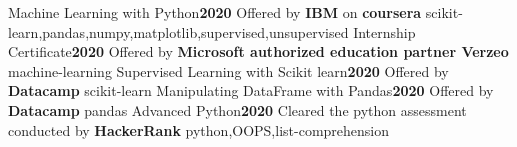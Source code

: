 \begin{projects}
\project
{Machine Learning with Python}{\bf\textcolor{OliveGreen}{2020}}
{}
{Offered by \textbf{IBM} on \bf{coursera}}
{scikit-learn,pandas,numpy,matplotlib,supervised,unsupervised}
\emptySeparator
\project
{Internship Certificate}{\bf\textcolor{OliveGreen}{2020}}
{}
{Offered by \textbf{Microsoft authorized education partner Verzeo}}
{machine-learning}
\emptySeparator
\project
{Supervised Learning with Scikit learn}{\bf\textcolor{OliveGreen}{2020}}
{}
{Offered by \textbf{Datacamp}}
{scikit-learn}
\emptySeparator
\project
{Manipulating DataFrame with Pandas}{\bf\textcolor{OliveGreen}{2020}}
{}
{Offered by \textbf{Datacamp}}
{pandas}
\emptySeparator
\project
{Advanced Python}{\bf\textcolor{OliveGreen}{2020}}{{}}
{Cleared the python assessment conducted by \textbf{HackerRank}}
{python,OOPS,list-comprehension}

\end{projects}